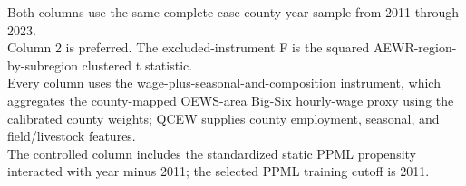 \begin{table}[htbp]
   \par \raggedright
   Both columns use the same complete-case county-year sample from 2011 through 2023.\\
   Column 2 is preferred. The excluded-instrument F is the squared AEWR-region-by-subregion clustered t statistic.\\
   Every column uses the wage-plus-seasonal-and-composition instrument, which aggregates the county-mapped OEWS-area Big-Six hourly-wage proxy using the calibrated county weights; QCEW supplies county employment, seasonal, and field/livestock features.\\
   The controlled column includes the standardized static PPML propensity interacted with year minus 2011; the selected PPML training cutoff is 2011.
\end{table}


